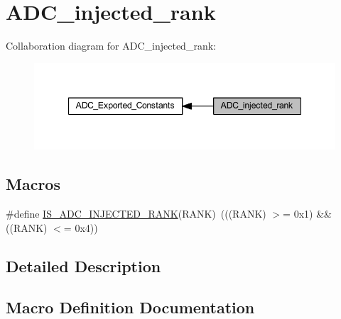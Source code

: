 \hypertarget{group___a_d_c__injected__rank}{}\section{A\+D\+C\+\_\+injected\+\_\+rank}
\label{group___a_d_c__injected__rank}
Collaboration diagram for A\+D\+C\+\_\+injected\+\_\+rank\+:
\nopagebreak
\begin{figure}[H]
\begin{center}
\leavevmode
\includegraphics[width=347pt]{group___a_d_c__injected__rank}
\end{center}
\end{figure}
\subsection*{Macros}
\begin{DoxyCompactItemize}
\item 
\#define \hyperlink{group___a_d_c__injected__rank_ga63f95f9a45f4d718aabc9e429d860e9d}{I\+S\+\_\+\+A\+D\+C\+\_\+\+I\+N\+J\+E\+C\+T\+E\+D\+\_\+\+R\+A\+NK}(R\+A\+NK)~(((R\+A\+NK) $>$= 0x1) \&\& ((\+R\+A\+N\+K) $<$= 0x4))
\end{DoxyCompactItemize}


\subsection{Detailed Description}


\subsection{Macro Definition Documentation}
\mbox{\label{group___a_d_c__injected__rank_ga63f95f9a45f4d718aabc9e429d860e9d}} 
